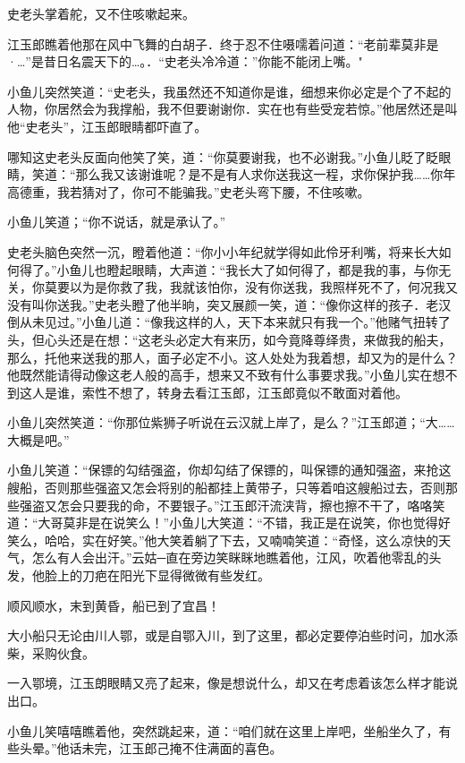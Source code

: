 \documentclass[12pt,oneside]{book}
\begin{document}
史老头掌着舵，又不住咳嗽起来。

江玉郎瞧着他那在风中飞舞的白胡子．终于忍不住嗫嚅着问道：``老前辈莫非是·\ldots{}''是昔日名震天下的\ldots。．``史老头冷冷道：''你能不能闭上嘴。"

小鱼儿突然笑道：``史老头，我虽然还不知道你是谁，细想来你必定是个了不起的人物，你居然会为我撑船，我不但要谢谢你．实在也有些受宠若惊。''他居然还是叫他``史老头''，江玉郎眼睛都吓直了。

哪知这史老头反面向他笑了笑，道：``你莫要谢我，也不必谢我。''小鱼儿眨了眨眼睛，笑道：``那么我又该谢谁呢？是不是有人求你送我这一程，求你保护我\ldots\ldots 你年高德重，我若猜对了，你可不能骗我。''史老头弯下腰，不住咳嗽。

小鱼儿笑道；``你不说话，就是承认了。''

史老头脑色突然一沉，瞪着他道：``你小小年纪就学得如此伶牙利嘴，将来长大如何得了。''小鱼儿也瞪起眼睛，大声道：``我长大了如何得了，都是我的事，与你无关，你莫要以为是你救了我，我就该怕你，没有你送我，我照样死不了，何况我又没有叫你送我。''史老头瞪了他半晌，突又展颜一笑，道：``像你这样的孩子．老汉倒从未见过。''小鱼儿道：``像我这样的人，天下本来就只有我一个。''他赌气扭转了头，但心头还是在想：``这老头必定大有来历，如今竟降尊绎贵，来做我的船夫，那么，托他来送我的那人，面子必定不小。这人处处为我着想，却又为的是什么？他既然能请得动像这老人般的高手，想来又不致有什么事要求我。''小鱼儿实在想不到这人是谁，索性不想了，转身去看江玉郎，江玉郎竟似不敢面对着他。

小鱼儿突然笑道：``你那位紫狮子听说在云汉就上岸了，是么？''江玉郎道；``大\ldots\ldots 大概是吧。''

小鱼儿笑道：``保镖的勾结强盗，你却勾结了保镖的，叫保镖的通知强盗，来抢这艘船，否则那些强盗又怎会将别的船都挂上黄带子，只等着咱这艘船过去，否则那些强盗又怎会只要我的命，不要银子。''江玉郎汗流浃背，擦也擦不干了，咯咯笑道：``大哥莫非是在说笑么！''小鱼儿大笑道：``不错，我正是在说笑，你也觉得好笑么，哈哈，实在好笑。''他大笑着躺了下去，又喃喃笑道：``奇怪，这么凉快的天气，怎么有人会出汗。''云姑─直在旁边笑眯眯地瞧着他，江风，吹着他零乱的头发，他脸上的刀疤在阳光下显得微微有些发红。

顺风顺水，末到黄昏，船已到了宜昌！

大小船只无论由川人鄂，或是自鄂入川，到了这里，都必定要停泊些时问，加水添柴，采购伙食。

一入鄂境，江玉朗眼睛又亮了起来，像是想说什么，却又在考虑着该怎么样才能说出口。

小鱼儿笑嘻嘻瞧着他，突然跳起来，道：``咱们就在这里上岸吧，坐船坐久了，有些头晕。''他话未完，江玉郎己掩不住满面的喜色。
\end{document}
